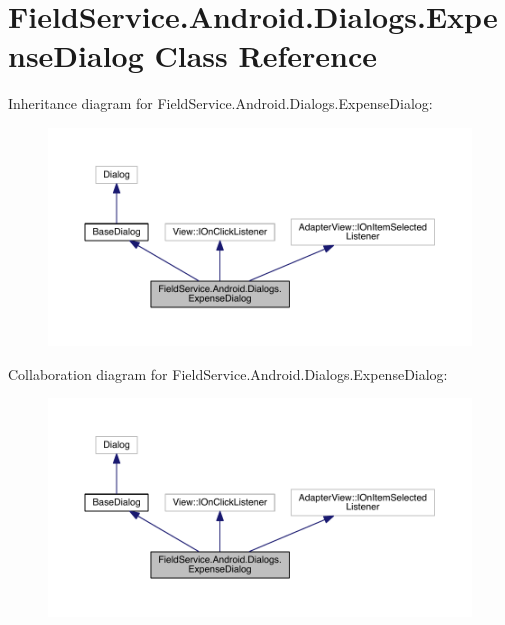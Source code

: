 \hypertarget{class_field_service_1_1_android_1_1_dialogs_1_1_expense_dialog}{\section{Field\+Service.\+Android.\+Dialogs.\+Expense\+Dialog Class Reference}
\label{class_field_service_1_1_android_1_1_dialogs_1_1_expense_dialog}
}


Inheritance diagram for Field\+Service.\+Android.\+Dialogs.\+Expense\+Dialog\+:
\nopagebreak
\begin{figure}[H]
\begin{center}
\leavevmode
\includegraphics[width=350pt]{class_field_service_1_1_android_1_1_dialogs_1_1_expense_dialog__inherit__graph}
\end{center}
\end{figure}


Collaboration diagram for Field\+Service.\+Android.\+Dialogs.\+Expense\+Dialog\+:
\nopagebreak
\begin{figure}[H]
\begin{center}
\leavevmode
\includegraphics[width=350pt]{class_field_service_1_1_android_1_1_dialogs_1_1_expense_dialog__coll__graph}
\end{center}
\end{figure}
